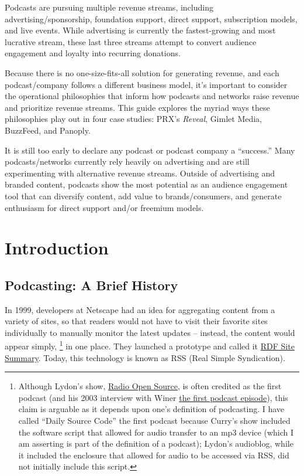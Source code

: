 \documentclass[notoc, symmetric, nobib, nols]{towcenter-guideto-book}
\begin{document}
Podcasts are pursuing multiple revenue streams, including advertising/sponsorship, foundation support, direct support, subscription models, and live events. While advertising is currently the fastest-growing and most lucrative stream, these last three streams attempt to convert audience engagement and loyalty into recurring donations. 

Because there is no one-size-fits-all solution for generating revenue, and each podcast/company follows a different business model, it's important to consider the operational philosophies that inform how podcasts and networks raise revenue and prioritize revenue streams. This guide explores the myriad ways these philosophies play out in four case studies: PRX's \textit{Reveal}, Gimlet Media, BuzzFeed, and Panoply. 

It is still too early to declare any podcast or podcast company a ``success.'' Many podcasts/networks currently rely heavily on advertising and are still experimenting with alternative revenue streams. Outside of advertising and branded content, podcasts show the most potential as an audience engagement tool that can diversify content, add value to brands/consumers, and generate enthusiasm for direct support and/or freemium models. 

\chapter{Introduction}

\section{Podcasting: A Brief History}

In 1999, developers at Netscape had an idea for aggregating content from a variety of sites, so that readers would not have to visit their favorite sites individually to manually monitor the latest updates -- instead, the content would appear simply, \footnote{Although Lydon’s show, \href{http://radioopensource.org/about/}{Radio Open Source}, is often credited as the first podcast (and his 2003 interview with Winer \href{http://blogs.harvard.edu/lydondev/2003/07/09/spoken-word-a-few-good-bloggers/}{the first podcast episode}), this claim is arguable as it depends upon one’s definition of podcasting. I have called ``Daily Source Code'' the first podcast because Curry's show included the software script that allowed for audio transfer to an mp3 device (which I am asserting is part of the definition of a podcast); Lydon’s audioblog, while it included the enclosure that allowed for audio to be accessed via RSS, did not initially include this script.} in one place.\autocite{WhatisRSS} They launched a prototype and called it \href{https://en.wikipedia.org/wiki/RSS}{RDF Site Summary}.\autocite{RSSWiki} Today, this technology is known as RSS (Real Simple Syndication). 
\end{document}
